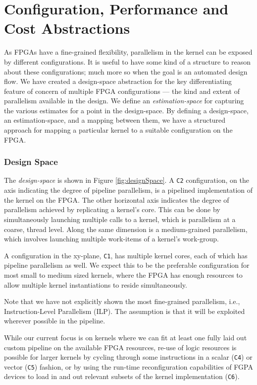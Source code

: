 \documentclass[]{heart2015_WN4Pre}
\begin{document}
\section{Configuration, Performance and Cost Abstractions}
\label{sec:design-estimation-space}

As FPGAs have a fine-grained flexibility, parallelism in the kernel can be exposed by different configurations.  It is useful to have some kind of a structure to reason about these configurations; much more so when the goal is an automated design flow. We have created a design-space abstraction for the key differentiating feature of concern of multiple FPGA configurations --- the kind and extent of parallelism available in the design. We define an \textit{estimation-space} for capturing the various estimates for a point in the design-space. By defining a design-space, an estimation-space, and a mapping between them, we have a structured approach for mapping a particular kernel to a suitable configuration on the FPGA.

\subsubsection*{Design Space}

The \textit{design-space} is shown in Figure \ref{fig:designSpace}. A \texttt{C2} configuration, on the axis indicating the degree of pipeline parallelism, is a pipelined implementation of the kernel on the FPGA. The other horizontal axis indicates the degree of parallelism achieved by replicating a kernel's core. This can be done by simultaneously launching multiple calls to a kernel, which is parallelism at a coarse, thread level. Along the same dimension is a medium-grained parallelism, which involves launching multiple work-items of a kernel's work-group. 


A configuration in the xy-plane, \texttt{C1}, has multiple kernel cores, each of which has pipeline parallelism as well. We expect this to be the preferable configuration for most small to medium sized kernels, where the FPGA has enough resources to allow multiple kernel instantiations to reside simultaneously. 

Note that we have not explicitly shown the most fine-grained parallelism, i.e., Instruction-Level Parallelism (ILP). The assumption is that it will be exploited wherever possible in the pipeline.

While our current focus is on kernels where we can fit at least one fully laid out custom pipeline on the available FPGA resources, re-use of logic resources is possible for larger kernels by cycling through some instructions in a scalar (\texttt{C4}) or vector (\texttt{C5}) fashion, or by using the run-time reconfiguration capabilities of FGPA devices to load in and out relevant subsets of the kernel implementation (\texttt{C6}). 
\end{document}
